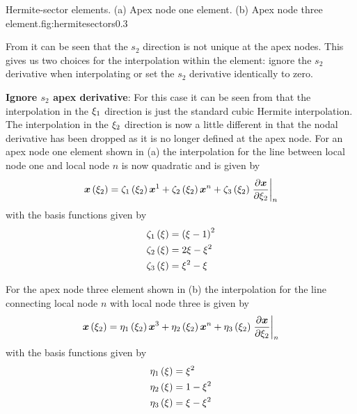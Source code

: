 {Hermite-sector elements. (a) Apex node one element. (b) Apex node three
  element.}{fig:hermitesectors}{0.3}

From  it can be seen that the $s_{2}$ direction is
not unique at the apex nodes. This gives us two choices for the interpolation
within the element: ignore the $s_{2}$ derivative when interpolating or set
the $s_{2}$ derivative identically to zero.

\textbf{Ignore $s_{2}$ apex derivative}: For this case it can be seen from
 that the interpolation in the $\xi_{1}$ direction
is just the standard cubic Hermite interpolation. The interpolation in the
$\xi_{2}$ direction is now a little different in that the nodal \arclen
derivative has been dropped as it is no longer defined at the apex node.  For
an apex node one element shown in (a) the
interpolation for the line between local node one and local node $n$ is now
quadratic and is given by
\begin{equation}
  \fnof{\vect{x}}{\xitwo}=\hsonebfn{1}{\xitwo}\nodept{\vect{x}}{1}+
  \hsonebfn{2}{\xitwo}\nodept{\vect{x}}{n}+
  \hsonebfn{3}{\xitwo}\evalat{\delby{\vect{x}}{\xitwo}}{n}
  \label{eqn:hsapex1xiinterp}
\end{equation}
with the basis functions given by
\begin{equation}
  \begin{split}
    \hsonebfn{1}{\xi}&=\pbrac{\xi-1}^{2} \\ 
    \hsonebfn{2}{\xi}&=2\xi-\xi^{2} \\
    \hsonebfn{3}{\xi}&=\xi^{2}-\xi
  \end{split}
  \label{eqn:hsapex1bfuns}
\end{equation}

For the apex node three element shown in (b) the
interpolation for the line connecting local node $n$ with local node three is
given by
\begin{equation}
  \fnof{\vect{x}}{\xitwo}=\hsthreebfn{1}{\xitwo}\nodept{\vect{x}}{3}+
  \hsthreebfn{2}{\xitwo}\nodept{\vect{x}}{n}+
  \hsthreebfn{3}{\xitwo}\evalat{\delby{\vect{x}}{\xitwo}}{n}
  \label{eqn:hsapex3xiinterp}
\end{equation}
with the basis functions given by
\begin{equation}
  \begin{split}
    \hsthreebfn{1}{\xi}&=\xi^{2} \\ 
    \hsthreebfn{2}{\xi}&=1-\xi^{2} \\ 
    \hsthreebfn{3}{\xi}&=\xi-\xi^{2}
  \end{split}
  \label{eqn:hsapex3Bfuns}
\end{equation}
 
